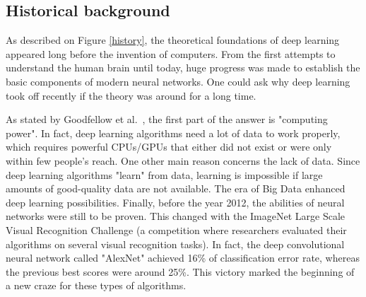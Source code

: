\subsection{Historical background}
\label{historical_background}

\setlength{\marginparwidth}{3cm}\leavevmode {}As described on Figure \ref{history}, the theoretical foundations of deep learning appeared long before the invention of computers. From the first attempts to understand the human brain until today, huge progress was made to establish the basic components of modern neural networks. One could ask why deep learning took off recently if the theory was around for a long time.

As stated by Goodfellow et al.~\cite{15}, the first part of the answer is "computing power". In fact, deep learning algorithms need a lot of data to work properly, which requires powerful CPUs/GPUs that either did not exist or were only within few people's reach. One other main reason concerns the lack of data. Since deep learning algorithms "learn" from data, learning is impossible if large amounts of good-quality data are not available. The era of Big Data enhanced deep learning possibilities. 
Finally, before the year 2012, the abilities of neural networks were still to be proven. This changed with the ImageNet Large Scale Visual Recognition Challenge (a competition where researchers evaluated their algorithms on several visual recognition tasks). In fact, the deep convolutional neural network called "AlexNet" achieved 16\% of classification error rate, whereas the previous best scores were around 25\%. This victory marked the beginning of a new craze for these types of algorithms.


